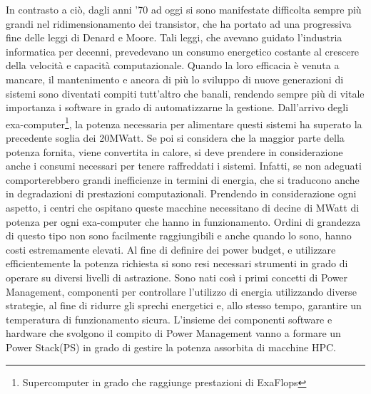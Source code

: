 In contrasto a ciò, dagli anni '70 ad oggi si sono manifestate difficolta sempre più grandi nel ridimensionamento dei transistor, che ha portato ad una progressiva fine delle leggi di Denard e Moore\cite{Dennardsscaling}\cite{Dennardsscaling2}. Tali leggi, che avevano guidato l'industria informatica per decenni, prevedevano un consumo energetico costante al crescere della velocità e capacità computazionale. Quando la loro efficacia è venuta a mancare, il mantenimento e ancora di più lo sviluppo di nuove generazioni di sistemi sono diventati compiti tutt'altro che banali\cite{growth}, rendendo sempre più di vitale importanza i software in grado di automatizzarne la gestione.
Dall'arrivo degli exa-computer\footnote{Supercomputer in grado che raggiunge prestazioni di ExaFlops}, la potenza necessaria per alimentare questi sistemi ha superato la precedente soglia dei 20MWatt\cite{TOP500}. Se poi si considera che la maggior parte della potenza fornita, viene convertita in calore, si deve prendere in considerazione anche i consumi necessari per tenere raffreddati i sistemi. Infatti, se non adeguati comporterebbero grandi inefficienze in termini di energia, che si traducono anche in degradazioni di prestazioni computazionali. Prendendo in considerazione ogni aspetto, i centri che ospitano queste macchine necessitano di decine di MWatt di potenza per ogni exa-computer che hanno in funzionamento. Ordini di grandezza di questo tipo non sono facilmente raggiungibili e anche quando lo sono, hanno costi estremamente elevati. 
Al fine di definire dei power budget, e utilizzare efficientemente la potenza richiesta si sono resi necessari strumenti in grado di operare su diversi livelli di astrazione. 
Sono nati così i primi concetti di Power Management, componenti per controllare l'utilizzo di energia utilizzando diverse strategie, al fine di ridurre gli sprechi energetici e, allo stesso tempo, garantire un temperatura di funzionamento sicura. %
L'insieme dei componenti software e hardware che svolgono il compito di Power Management vanno a formare un Power Stack(PS) in grado di gestire la potenza assorbita di macchine HPC.



